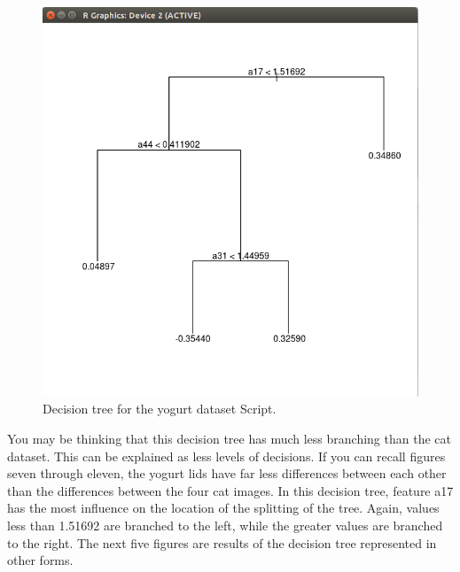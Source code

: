 \documentclass[12pt, letterpaper]{article}
\begin{document}
\begin{figure}[H]
\centering
\includegraphics[width=5.0in]{yogurtplot4}
\caption{Decision tree for the yogurt dataset Script.}
\label{fig:dtyd}
\end{figure}

You may be thinking that this decision tree has much less branching than the cat dataset. This can be explained as less levels of decisions. If you can recall figures seven through eleven, the yogurt lids have far less differences between each other than the differences between the four cat images. In this decision tree, feature a17 has the most influence on the location of the splitting of the tree. Again, values less than 1.51692 are branched to the left, while the greater values are branched to the right. The next five figures are results of the decision tree represented in other forms.
\end{document}
